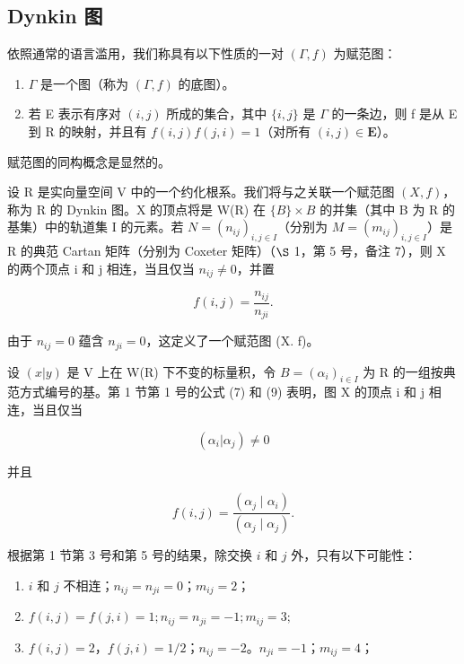 \subsection{Dynkin 图}

依照通常的语言滥用，我们称具有以下性质的一对 \((\Gamma, f)\) 为赋范图：

\begin{enumerate}
\def\labelenumi{\arabic{enumi})}
\item
  \(\Gamma\) 是一个图（称为 \((\Gamma, f)\) 的底图）。
\item
  若 E 表示有序对 \((i,j)\) 所成的集合，其中 \(\{i,j\}\) 是 \(\Gamma\) 的一条边，则 f 是从 E 到 R 的映射，并且有 \(f(i,j)f(j,i)=1\)（对所有 \((i,j)\in\mathbf{E}\)）。
\end{enumerate}

赋范图的同构概念是显然的。

设 R 是实向量空间 V 中的一个约化根系。我们将与之关联一个赋范图 \((X, f)\)，称为 R 的 Dynkin 图。X 的顶点将是 W(R) 在 \(\{B\} \times B\) 的并集（其中 B 为 R 的基集）中的轨道集 I 的元素。若 \(N = (n_{ij})_{i,j \in I}\)（分别为 \(M = (m_{ij})_{i,j \in I}\)）是 R 的典范 Cartan 矩阵（分别为 Coxeter 矩阵）（\(\S\) 1，第 5 号，备注 7），则 X 的两个顶点 i 和 j 相连，当且仅当 \(n_{ij} \neq 0\)，并置

\[
f (i, j) = \frac {n _ {i j}}{n _ {j i}}.
\]

由于 \(n_{ij} = 0\) 蕴含 \(n_{ji} = 0\)，这定义了一个赋范图 (X. f)。

设 \((x|y)\) 是 V 上在 W(R) 下不变的标量积，令 \(B = (\alpha_i)_{i \in I}\) 为 R 的一组按典范方式编号的基。第 1 节第 1 号的公式 (7) 和 (9) 表明，图 X 的顶点 i 和 j 相连，当且仅当

\[
(\alpha_ {i} | \alpha_ {j}) \neq 0
\]

并且

\[
f (i, j) = \frac {\left(\alpha_ {j} \mid \alpha_ {i}\right)}{\left(\alpha_ {j} \mid \alpha_ {j}\right)}.
\]

根据第 1 节第 3 号和第 5 号的结果，除交换 \(i\) 和 \(j\) 外，只有以下可能性：

\begin{enumerate}
\def\labelenumi{\arabic{enumi})}
\item
  \(i\) 和 \(j\) 不相连；\(n_{ij} = n_{ji} = 0\)；\(m_{ij} = 2\)；
\item
  \(f(i,j) = f(j,i) = 1; n_{ij} = n_{ji} = -1; m_{ij} = 3;\)
\item
  \(f(i,j) = 2\)，\(f(j,i) = 1/2\)；\(n_{ij} = -2\)。\(n_{ji} = -1\)；\(m_{ij} = 4\)；
\end{enumerate}

